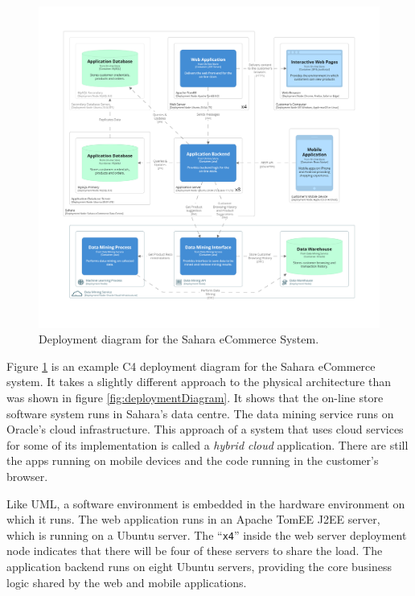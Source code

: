 \begin{figure}[h!]
    \centering
    \begin{adjustwidth}{-7.5mm}{-7.5mm}
        \includegraphics[trim=195 235 195 198,clip,width=0.95\paperwidth]{images/c4/deployment_diagram.png}
    \end{adjustwidth}
    \caption{Deployment diagram for the Sahara eCommerce System.}
    \label{fig:c4_deployment}
\end{figure}

Figure \ref{fig:c4_deployment} is an example C4 deployment diagram for the Sahara eCommerce system.
It takes a slightly different approach to the physical architecture than was shown in figure \ref{fig:deploymentDiagram}.
It shows that the on-line store software system runs in Sahara's data centre.
The data mining service runs on Oracle's cloud infrastructure.
This approach of a system that uses cloud services for some of its implementation is called a \emph{hybrid cloud} application.
There are still the apps running on mobile devices and the code running in the customer's browser.

Like UML, a software environment is embedded in the hardware environment on which it runs.
The web application runs in an Apache TomEE J2EE server, which is running on a Ubuntu server.
The ``\texttt{x4}'' inside the web server deployment node indicates that there will be four of these servers to share the load.
The application backend runs on eight Ubuntu servers, providing the core business logic shared by the web and mobile applications.

